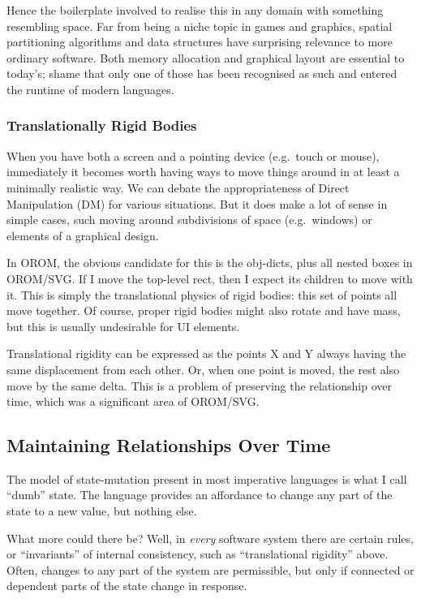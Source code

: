 Hence the boilerplate involved to realise this in any domain with
something resembling space. Far from being a niche topic in games and
graphics, spatial partitioning algorithms and data structures have
surprising relevance to more ordinary software. Both memory allocation
and graphical layout are essential to today's; shame that only one of
those has been recognised as such and entered the runtime of modern
languages.

\hypertarget{translationally-rigid-bodies}{%
\subsubsection{Translationally Rigid
Bodies}\label{translationally-rigid-bodies}}

When you have both a screen and a pointing device (e.g.~touch or mouse),
immediately it becomes worth having ways to move things around in at
least a minimally realistic way. We can debate the appropriateness of
Direct Manipulation (DM) for various situations. But it does make a lot
of sense in simple cases, such moving around subdivisions of space
(e.g.~windows) or elements of a graphical design.

In OROM, the obvious candidate for this is the obj-dicts, plus all
nested boxes in OROM/SVG. If I move the top-level rect, then I expect
its children to move with it. This is simply the translational physics
of rigid bodies: this set of points all move together. Of course, proper
rigid bodies might also rotate and have mass, but this is usually
undesirable for UI elements.

Translational rigidity can be expressed as the points X and Y always
having the same displacement from each other. Or, when one point is
moved, the rest also move by the same delta. This is a problem of
preserving the relationship over time, which was a significant area of
OROM/SVG.

\hypertarget{maintaining-relationships-over-time}{%
\subsection{Maintaining Relationships Over
Time}\label{maintaining-relationships-over-time}}

The model of state-mutation present in most imperative languages is what
I call ``dumb'' state. The language provides an affordance to change any
part of the state to a new value, but nothing else.

What more could there be? Well, in \emph{every} software system there
are certain rules, or ``invariants'' of internal consistency, such as
``translational rigidity'' above. Often, changes to any part of the
system are permissible, but only if connected or dependent parts of the
state change in response.


